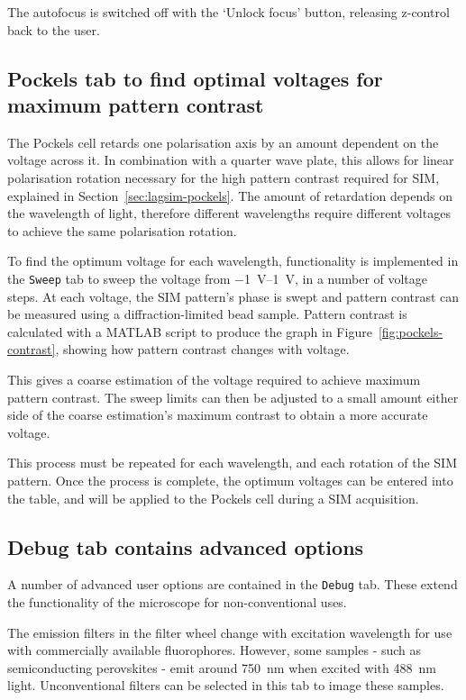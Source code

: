The autofocus is switched off with the `Unlock focus' button, releasing z-control back to the user. 

\subsection{Pockels tab to find optimal voltages for maximum pattern contrast} 
The Pockels cell retards one polarisation axis by an amount dependent on the voltage across it. 
In combination with a quarter wave plate, this allows for linear polarisation rotation necessary for the high pattern contrast required for SIM, explained in Section~\ref{sec:lagsim-pockels}. 
The amount of retardation depends on the wavelength of light, therefore different wavelengths require different voltages to achieve the same polarisation rotation. 

To find the optimum voltage for each wavelength, functionality is implemented in the \texttt{Sweep} tab to sweep the voltage from \SIrange{-1}{1}{\volt}, in a number of voltage steps. 
At each voltage, the SIM pattern's phase is swept and pattern contrast can be measured using a diffraction-limited bead sample. 
Pattern contrast is calculated with a MATLAB script to produce the graph in Figure~\ref{fig:pockels-contrast}, showing how pattern contrast changes with voltage. 

This gives a coarse estimation of the voltage required to achieve maximum pattern contrast. 
The sweep limits can then be adjusted to a small amount either side of the coarse estimation's maximum contrast to obtain a more accurate voltage. 

This process must be repeated for each wavelength, and each rotation of the SIM pattern. 
Once the process is complete, the optimum voltages can be entered into the table, and will be applied to the Pockels cell during a SIM acquisition. 


\subsection{Debug tab contains advanced options}
A number of advanced user options are contained in the \texttt{Debug} tab. 
These extend the functionality of the microscope for non-conventional uses. 

The emission filters in the filter wheel change with excitation wavelength for use with commercially available fluorophores.
However, some samples - such as semiconducting perovskites - emit around \SI{750}{\nano\metre} when excited with \SI{488}{\nano\metre} light. 
Unconventional filters can be selected in this tab to image these samples. 

